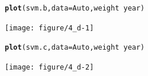 \documentclass[12pt,fleqn]{article}\usepackage[]{graphicx}\usepackage[]{color}
\makeatletter
\newcommand{\hlopt}[1]{\textcolor[rgb]{0,0,0}{#1}}%
\newcommand{\hlstd}[1]{\textcolor[rgb]{0.345,0.345,0.345}{#1}}%
\newcommand{\hlkwc}[1]{\textcolor[rgb]{0.333,0.667,0.333}{#1}}%
\newcommand{\hlkwd}[1]{\textcolor[rgb]{0.737,0.353,0.396}{\textbf{#1}}}%
\newenvironment{kframe}{%
 \def\at@end@of@kframe{}%
 \ifinner\ifhmode%
  \def\at@end@of@kframe{\end{minipage}}%
  \begin{minipage}{\columnwidth}%
 \fi\fi%
 \def\FrameCommand##1{\hskip\@totalleftmargin \hskip-\fboxsep
 \colorbox{shadecolor}{##1}\hskip-\fboxsep
     \hskip-\linewidth \hskip-\@totalleftmargin \hskip\columnwidth}%
 \MakeFramed {\advance\hsize-\width
   \@totalleftmargin\z@ \linewidth\hsize
   \@setminipage}}%
 {\par\unskip\endMakeFramed%
 \at@end@of@kframe}
\newenvironment{knitrout}{}{} %
\theoremstyle{definition}
\makeatother
\begin{document}
\begin{enumerate}[1.]
\begin{enumerate}
\begin{knitrout}
\begin{kframe}
\begin{alltt}
\hlkwd{plot}\hlstd{(svm.b,} \hlkwc{data}\hlstd{=Auto, weight}\hlopt{~}\hlstd{year)}
\end{alltt}
\end{kframe}
\texttt{[image: figure/4\_d-1]} 
\begin{kframe}\begin{alltt}
\hlkwd{plot}\hlstd{(svm.c,} \hlkwc{data}\hlstd{=Auto, weight}\hlopt{~}\hlstd{year)}
\end{alltt}
\end{kframe}
\texttt{[image: figure/4\_d-2]} 

\end{knitrout}
      \end{enumerate}
	\end{enumerate}
\end{document}

